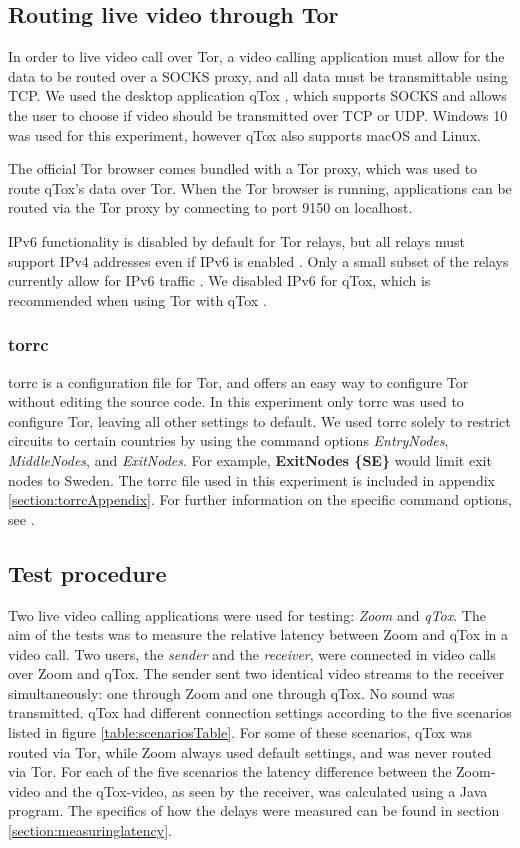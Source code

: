 \documentclass{kththesis}
\begin{document}
\subsection{Routing live video through Tor}
In order to live video call over Tor, a video calling application must allow for the data to be routed over a SOCKS proxy, and all data must be transmittable using TCP. We used the desktop application qTox \parencite{qTox}, which supports SOCKS and allows the user to choose if video should be transmitted over TCP or UDP. Windows 10 was used for this experiment, however qTox also supports macOS and Linux.

The official Tor browser comes bundled with a Tor proxy, which was used to route qTox's data over Tor. When the Tor browser is running, applications can be routed via the Tor proxy by connecting to port 9150 on localhost.

IPv6 functionality is disabled by default for Tor relays, but all relays must support IPv4 addresses even if IPv6 is enabled \parencite{TorIPv6}. Only a small subset of the relays currently allow for IPv6 traffic \parencite{TorMetricsIPv6}. We disabled IPv6 for qTox, which is recommended when using Tor with qTox \parencite{qToxOverTor}.

\subsubsection{torrc}
torrc is a configuration file for Tor, and offers an easy way to configure Tor without editing the source code. In this experiment only torrc was used to configure Tor, leaving all other settings to default. We used torrc solely to restrict circuits to certain countries by using the command options \emph{EntryNodes}, \emph{MiddleNodes}, and \emph{ExitNodes}. For example, \textbf{ExitNodes \{SE\}} would limit exit nodes to Sweden. The torrc file used in this experiment is included in appendix \ref{section:torrcAppendix}. For further information on the specific command options, see \textcite{torrcmanpages}.

\subsection{Test procedure}
Two live video calling applications were used for testing: \emph{Zoom} and \emph{qTox}. The aim of the tests was to measure the relative latency between Zoom and qTox in a video call. Two users, the \emph{sender} and the \emph{receiver}, were connected in video calls over Zoom and qTox. The sender sent two identical video streams to the receiver simultaneously: one through Zoom and one through qTox. No sound was transmitted. qTox had different connection settings according to the five scenarios listed in figure \ref{table:scenariosTable}. For some of these scenarios, qTox was routed via Tor, while Zoom always used default settings, and was never routed via Tor. For each of the five scenarios the latency difference between the Zoom-video and the qTox-video, as seen by the receiver, was calculated using a Java program. The specifics of how the delays were measured can be found in section \ref{section:measuringlatency}.
\end{document}
